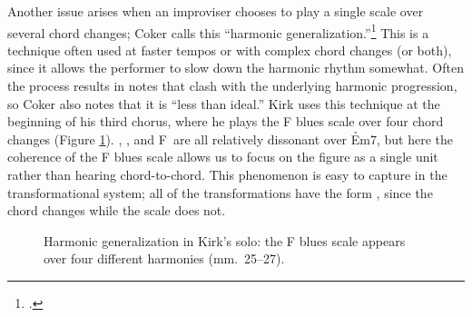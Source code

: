 Another issue arises when an improviser chooses to play a single scale over
several chord changes; Coker calls this ``harmonic
generalization.''\footcite[45--49]{coker:elements} This is a technique often
used at faster tempos or with complex chord changes (or both), since it allows
the performer to slow down the harmonic rhythm somewhat. Often the process
results in notes that clash with the underlying harmonic progression, so Coker
also notes that it is ``less than ideal.'' Kirk uses this technique
at the beginning of his third chorus, where he plays the F blues scale over
four chord changes (Figure \ref{csa:harmonic-generalization}).
\Bflat, \Aflat, and F\nat\ are all relatively dissonant over \h{Em7}, but here
the coherence of the F blues scale allows us to focus on the figure as a
single unit rather than hearing chord-to-chord. This phenomenon is easy to
capture in the transformational system; all of the transformations have the
form , since the chord changes while the scale does not.

\begin{figure}[tbp]
  \caption[Harmonic generalization in Kirk's solo.]{Harmonic generalization in
    Kirk's solo: the F blues scale appears over four different harmonies
    (mm.~25--27).}
  \label{csa:harmonic-generalization}
\end{figure}






